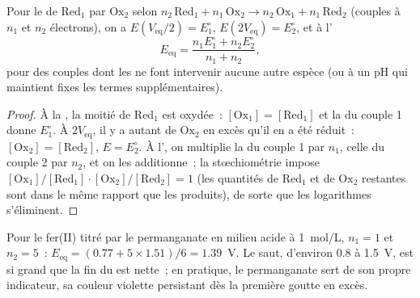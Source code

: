 \begin{proposition}\label{prop:b1:titration-methods:potentiometric-points}
Pour le  de $\mathrm{Red_1}$ par $\mathrm{Ox_2}$ selon
$n_2\,\mathrm{Red_1} + n_1\,\mathrm{Ox_2} \to n_2\,\mathrm{Ox_1} +
n_1\,\mathrm{Red_2}$ (couples à $n_1$ et $n_2$ électrons), on a
$E(V_{\mathrm{eq}}/2) = E^\circ_1$, $E(2V_{\mathrm{eq}}) =
E^\circ_2$, et à l'
\[
  E_{\mathrm{eq}} = \frac{n_1E^\circ_1 + n_2E^\circ_2}{n_1 + n_2},
\]
pour des couples dont les  ne font intervenir aucune autre
espèce (ou à un pH qui maintient fixes les termes supplémentaires).
\end{proposition}

\begin{proof}
À la , la moitié de $\mathrm{Red_1}$ est oxydée~:
$[\mathrm{Ox_1}] = [\mathrm{Red_1}]$ et la  du couple 1
donne $E^\circ_1$. À $2V_{\mathrm{eq}}$, il y a autant de
$\mathrm{Ox_2}$ en excès qu'il en a été réduit~:
$[\mathrm{Ox_2}] = [\mathrm{Red_2}]$, $E = E^\circ_2$. À l',
on multiplie la  du couple 1 par $n_1$, celle du
couple 2 par $n_2$, et on les additionne~; la stœchiométrie impose
$[\mathrm{Ox_1}]/[\mathrm{Red_1}] \cdot [\mathrm{Ox_2}]/[\mathrm{Red_2}] = 1$
(les quantités de $\mathrm{Red_1}$ et de $\mathrm{Ox_2}$ restantes sont
dans le même rapport que les produits), de sorte que les logarithmes
s'éliminent.
\end{proof}

Pour le fer(II) titré par le permanganate en milieu acide à
\qty{1}{mol/L}, $n_1 = 1$ et $n_2 =
5$~: $E_{\mathrm{eq}} = (0.77 + 5 \times 1.51)/6 = 1.39$~V. Le saut,
d'environ 0.8 à 1.5~V, est si grand que la fin du  est nette~; en
pratique, le permanganate sert de son propre indicateur, sa couleur
violette persistant dès la première goutte en excès.

